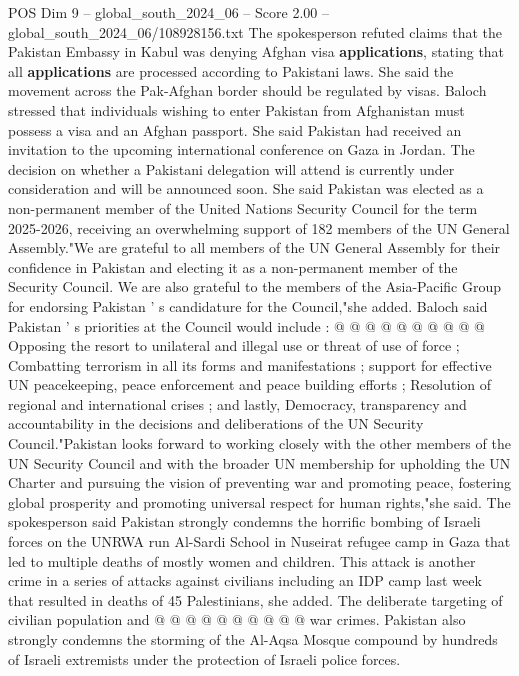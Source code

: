 \begin{textsample}{POS Dim 9 – global\_south\_2024\_06 – Score 2.00 – global\_south\_2024\_06/108928156.txt}  \label{ex:f9_pos_085}
The spokesperson refuted claims that the Pakistan Embassy in Kabul was denying Afghan visa \textbf{applications}, stating that all \textbf{applications} are processed according to Pakistani laws.
She said the movement across the Pak-Afghan border should be regulated by visas.
Baloch stressed that individuals wishing to enter Pakistan from Afghanistan must possess a visa and an Afghan passport.
She said Pakistan had received an invitation to the upcoming international conference on Gaza in Jordan.
The decision on whether a Pakistani delegation will attend is currently under consideration and will be announced soon.
She said Pakistan was elected as a non-permanent member of the United Nations Security Council for the term 2025-2026, receiving an overwhelming support of 182 members of the UN General Assembly."We are grateful to all members of the UN General Assembly for their confidence in Pakistan and electing it as a non-permanent member of the Security Council.
We are also grateful to the members of the Asia-Pacific Group for endorsing Pakistan ' s candidature for the Council,"she added.
Baloch said Pakistan ' s priorities at the Council would include : @ @ @ @ @ @ @ @ @ @ Opposing the resort to unilateral and illegal use or threat of use of force ; Combatting terrorism in all its forms and manifestations ; support for effective UN peacekeeping, peace enforcement and peace building efforts ; Resolution of regional and international crises ; and lastly, Democracy, transparency and accountability in the decisions and deliberations of the UN Security Council."Pakistan looks forward to working closely with the other members of the UN Security Council and with the broader UN membership for upholding the UN Charter and pursuing the vision of preventing war and promoting peace, fostering global prosperity and promoting universal respect for human rights,"she said.
The spokesperson said Pakistan strongly condemns the horrific bombing of Israeli forces on the UNRWA run Al-Sardi School in Nuseirat refugee camp in Gaza that led to multiple deaths of mostly women and children.
This attack is another crime in a series of attacks against civilians including an IDP camp last week that resulted in deaths of 45 Palestinians, she added.
The deliberate targeting of civilian population and @ @ @ @ @ @ @ @ @ @ war crimes.
Pakistan also strongly condemns the storming of the Al-Aqsa Mosque compound by hundreds of Israeli extremists under the protection of Israeli police forces.

\end{textsample}
